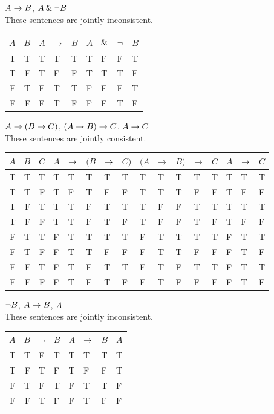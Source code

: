 \begin{earg}
\item $A \rightarrow B$, $A \mathbin{\&} {\neg} B$ \\
These sentences are jointly inconsistent.
\begin{flushleft}
\begin{tabular}{d d | f e h | f e e e}
$A$ & $B$ & $A$ & $\rightarrow$ & $B$ & $A$ & $\mathbin{\&}$ & ${\neg}$ & $B$\\
\hline
T & T &    T & T & T &     T & F & F & T\Tstrut\\
T & F &    T & F & F &     T & T & T & F\\
F & T &    F & T & T &     F & F & F & T\\
F & F &    F & T & F &     F & F & T & F
\end{tabular}
\end{flushleft}\medskip

\item $A \rightarrow (B \rightarrow C)$, $(A \rightarrow B) \rightarrow C$, $A \rightarrow C$\\
These sentences are jointly consistent.
\begin{flushleft}
\begin{tabular}{d d d | f e e e h | f e e e h | f e e}
$A$ & $B$ & $C$ & $A$ & $\rightarrow$ & $(B$ & $\rightarrow$ & $C)$ & $(A$ & $\rightarrow$ & $B)$ & $\rightarrow$ & $C$ & $A$ & $\rightarrow$ & $C$\\
\hline
T & T & T &    T & T &   T & T & T &          T & T & T &   T & T &     T & T & T\Tstrut\\
T & T & F &    T & F &   T & F & F &          T & T & T &   F & F &      T & F & F\\
T & F & T &    T & T &   F & T & T &          T & F & F &   T & T &      T & T & T\\
T & F & F &    T & T &   F & T & F &          T & F & F &   T & F &      T & F & F\\\hline
F & T & T &    F & T &   T & T & T &          F & T & T &   T & T &     F & T & T\Tstrut\\
F & T & F &    F & T &   T & F & F &          F & T & T &   F & F &      F & T & F\\
F & F & T &    F & T &   F & T & T &          F & T & F &   T & T &      F & T & T\\
F & F & F &    F & T &   F & T & F &          F & T & F  &  F & F  &     F & T & F 
\end{tabular}
\end{flushleft}\medskip

\item ${\neg} B$, $A \rightarrow B$, $A$\\
These sentences are jointly inconsistent.
\begin{flushleft}
\begin{tabular}{d d | f h | f e h | f}
$A$ & $B$ & ${\neg}$ & $B$ & $A$ & $\rightarrow$ & $B$ & $A$\\
\hline
T & T &  F & T &    T & T & T &   T\Tstrut\\ 
T & F &  T & F &    T & F & F &   T\\ 
F & T &  F & T &    F & T & T &   F\\ 
F & F &  T & F &    F & T & F &   F
\end{tabular}
\end{flushleft}\medskip


\end{earg}
